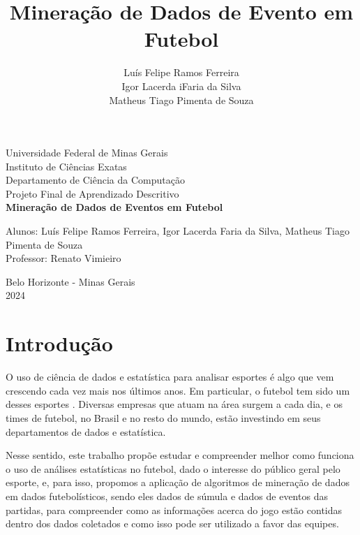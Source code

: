 \documentclass{article}
\begin{document}
\begin{titlepage}
	\begin{center}
		{\large Universidade Federal de Minas Gerais}\\[0.2cm]
		{\large Instituto de Ciências Exatas}\\[0.2cm]
		{\large Departamento de Ciência da Computação}\\[0.2cm]
		{\large Projeto Final de Aprendizado Descritivo}\\[5.1cm]
		{\large \bf Mineração de Dados de Eventos em Futebol}\\[5.1cm]
	\end{center}
	{\large Alunos: Luís Felipe Ramos Ferreira, Igor Lacerda Faria da
	Silva,
	Matheus Tiago Pimenta de Souza}\\[0.7cm]
	{\large Professor: Renato Vimieiro}\\[5.1cm]
	\begin{center}
		{\large Belo Horizonte - Minas Gerais}\\[0.2cm]
		{\large 2024}
	\end{center}
\end{titlepage}

\newpage
\renewcommand{\contentsname}{Sumário}
\tableofcontents
\newpage

\title{Mineração de Dados de Evento em Futebol}
\author{Luís Felipe Ramos Ferreira \\  Igor Lacerda iFaria da Silva \\ Matheus
	Tiago Pimenta de Souza}

\maketitle

\section{Introdução}

O uso de ciência de dados e estatística para analisar esportes é algo que vem
crescendo cada vez mais nos últimos anos. Em
particular, o futebol tem sido um desses
esportes \cite{takvorian2021beautiful}. Diversas empresas que atuam na
área surgem a cada dia, e os times de futebol, no Brasil e no resto do
mundo, estão investindo em seus departamentos de dados e estatística.

Nesse sentido, este trabalho propõe estudar e compreender melhor como funciona
o uso de análises estatísticas no futebol, dado o interesse do público geral pelo esporte,
e, para isso, propomos a aplicação de algoritmos de mineração de dados em
dados futebolísticos, sendo eles dados de súmula e dados de eventos das partidas, 
para compreender como as informações acerca do
jogo estão contidas dentro dos dados coletados e como isso pode ser utilizado a
favor das equipes.
\end{document}
